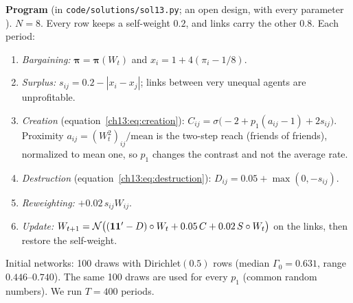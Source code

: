\documentclass[../solutions_manual.tex]{subfiles}
\begin{document}
\textbf{Program} (in \texttt{code/solutions/sol13.py}; an open design, with every parameter \illustrative). $N = 8$. Every row keeps a self-weight $0.2$, and links carry the other $0.8$. Each period:
\begin{enumerate}
\item \emph{Bargaining:} $\boldsymbol{\pi} = \boldsymbol{\pi}(W_t)$ and $x_i = 1 + 4(\pi_i - 1/8)$.
\item \emph{Surplus:} $s_{ij} = 0.2 - |x_i - x_j|$; links between very unequal agents are unprofitable.
\item \emph{Creation} (equation~\eqref{ch13:eq:creation}): $C_{ij} = \sigma\big(-2 + p_1(a_{ij} - 1) + 2s_{ij}\big)$. Proximity $a_{ij} = (W_t^2)_{ij}/\text{mean}$ is the two-step reach (friends of friends), normalized to mean one, so $p_1$ changes the contrast and not the average rate.
\item \emph{Destruction} (equation~\eqref{ch13:eq:destruction}): $D_{ij} = 0.05 + \max(0, -s_{ij})$.
\item \emph{Reweighting:} $+0.02\,s_{ij}W_{ij}$.
\item \emph{Update:} $W_{t+1} = \mathcal{N}\big((\mathbf{1}\mathbf{1}' - D)\circ W_t + 0.05\,C + 0.02\,S\circ W_t\big)$ on the links, then restore the self-weight.
\end{enumerate}
Initial networks: 100 draws with Dirichlet$(0.5)$ rows (median $\Gamma_0 = 0.631$, range $0.446$--$0.740$). The same 100 draws are used for every $p_1$ (common random numbers). We run $T = 400$ periods.
\end{document}
